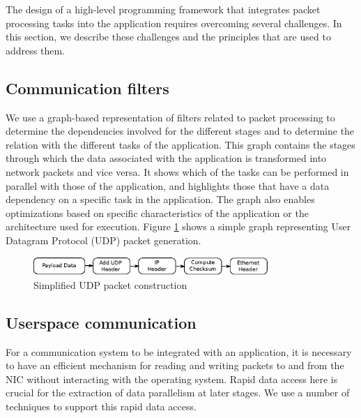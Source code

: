 \documentclass[10pt, conference, compsocconf, reqno]{IEEEtran}
\newcommand{\comment}[1]{}
\begin{document}
The design of a high-level programming framework that integrates packet processing tasks into the application requires overcoming several challenges. \comment{The entire system is driven by the extent to which parallelism can be extracted. Some of the techniques that can be applied to the packet processing tasks can be used for the tasks related to the application.} In this section, we describe these challenges and the principles that are used to address them. \comment{We focus on the methodologies related to the packet processing tasks and the parallel processing engine itself.}

\subsection{Communication filters}

\comment{Understanding the set of packet processing tasks associated with the application is essential to performing them in parallel.} We use a graph-based representation of filters related to packet processing to determine the dependencies involved for the different stages and to determine the relation with the different tasks of the application. This graph contains the stages through which the data associated with the application is transformed into network packets and vice versa. It shows which of the tasks can be performed in parallel with those of the application, and highlights those that have a data dependency on a specific task in the application. The graph also enables optimizations based on specific characteristics of the application or the architecture used for execution. Figure \ref{fig2} shows a simple graph representing User Datagram Protocol (UDP) packet generation.

\begin{figure}[ht]
\centering
\includegraphics[width=3.5in]{pack-op}
\caption{Simplified UDP packet construction}
\label{fig2}
\end{figure}

\subsection{Userspace communication}

For a communication system to be integrated with an application, it is necessary to have an efficient mechanism for reading and writing packets to and from the NIC without interacting with the operating system. Rapid data access here is crucial for the extraction of data parallelism at later stages. We use a number of techniques to support this rapid data access.\comment{In using the techniques described below we exploit the modern NIC architecture to its full potential.}
\end{document}
